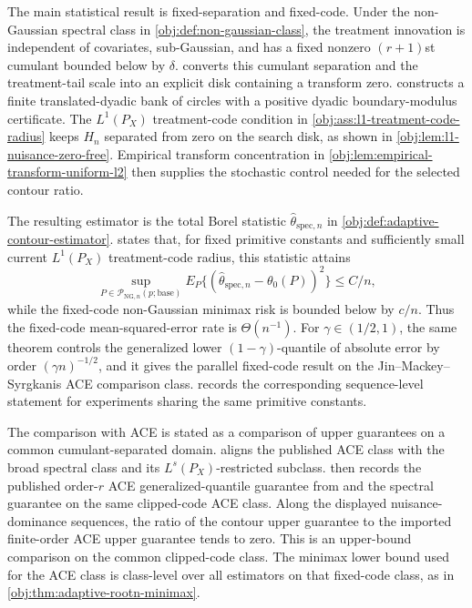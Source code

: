 \documentclass[11pt]{article}
\begin{document}
The main statistical result is fixed-separation and fixed-code. Under the non-Gaussian spectral class in \cref{obj:def:non-gaussian-class}, the treatment innovation is independent of covariates, sub-Gaussian, and has a fixed nonzero \((r+1)\)st cumulant bounded below by \(\delta\).  converts this cumulant separation and the treatment-tail scale into an explicit disk containing a transform zero.  constructs a finite translated-dyadic bank of circles with a positive dyadic boundary-modulus certificate. The \(L^1(P_X)\) treatment-code condition in \cref{obj:ass:l1-treatment-code-radius} keeps \(H_n\) separated from zero on the search disk, as shown in \cref{obj:lem:l1-nuisance-zero-free}. Empirical transform concentration in \cref{obj:lem:empirical-transform-uniform-l2} then supplies the stochastic control needed for the selected contour ratio.

The resulting estimator is the total Borel statistic \(\widehat\theta_{\mathrm{spec},n}\) in \cref{obj:def:adaptive-contour-estimator}.  states that, for fixed primitive constants and sufficiently small current \(L^1(P_X)\) treatment-code radius, this statistic attains
\[
\sup_{P\in\mathcal P_{\mathrm{NG},n}(p;\mathrm{base})}
E_P\{(\widehat\theta_{\mathrm{spec},n}-\theta_0(P))^2\}
\le C/n,
\]
while the fixed-code non-Gaussian minimax risk is bounded below by \(c/n\). Thus the fixed-code mean-squared-error rate is \(\Theta(n^{-1})\). For \(\gamma\in(1/2,1)\), the same theorem controls the generalized lower \((1-\gamma)\)-quantile of absolute error by order \((\gamma n)^{-1/2}\), and it gives the parallel fixed-code result on the Jin--Mackey--Syrgkanis ACE comparison class.  records the corresponding sequence-level statement for experiments sharing the same primitive constants.

The comparison with ACE is stated as a comparison of upper guarantees on a common cumulant-separated domain.  aligns the published ACE class with the broad spectral class and its \(L^s(P_X)\)-restricted subclass.  then records the published order-\(r\) ACE generalized-quantile guarantee from \citet{JinMackeySyrgkanis2025} and the spectral guarantee on the same clipped-code ACE class. Along the displayed nuisance-dominance sequences, the ratio of the contour upper guarantee to the imported finite-order ACE upper guarantee tends to zero. This is an upper-bound comparison on the common clipped-code class. The minimax lower bound used for the ACE class is class-level over all estimators on that fixed-code class, as in \cref{obj:thm:adaptive-rootn-minimax}.
\end{document}
